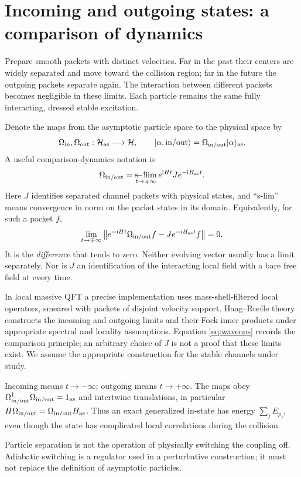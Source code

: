 \documentclass[11pt]{article}
\newcommand{\ii}{\mathrm i}
\newcommand{\ket}[1]{\lvert#1\rangle}
\newcommand{\module}[1]{\clearpage\section{#1}}
\newcommand{\cH}{\mathcal H}
\begin{document}
\module{Incoming and outgoing states: a comparison of dynamics}
Prepare smooth packets with distinct velocities. Far in the past their
centers are widely separated and move toward the collision region; far
in the future the outgoing packets separate again. The interaction
between different packets becomes negligible in these limits. Each
particle remains the same fully interacting, dressed stable excitation.

Denote the maps from the asymptotic particle space to the physical space by
\begin{equation}
 \Omega_{\rm in},\Omega_{\rm out}:\cH_{\rm as}\longrightarrow\cH,
 \qquad
 \ket{\alpha,\mathrm{in/out}}=\Omega_{\rm in/out}\ket{\alpha}_{\rm as}.
\end{equation}
A useful comparison-dynamics notation is
\begin{equation}
 \Omega_{\rm in/out}=\mathop{\mathrm{s\!-!lim}}_{t\to\mp\infty}
 e^{\ii Ht}J e^{-\ii H_{\rm as}t}.
 \label{eq:waveops}
\end{equation}
Here \(J\) identifies separated channel packets with physical states, and
``s-lim'' means convergence in norm on the packet states in its domain.
Equivalently, for such a packet \(f\),
\begin{equation}
 \lim_{t\to\mp\infty}
 \big\|e^{-\ii Ht}\Omega_{\rm in/out}f
       -J e^{-\ii H_{\rm as}t}f\big\|=0.
 \label{eq:comparison}
\end{equation}
It is the \emph{difference} that tends to zero. Neither evolving vector
usually has a limit separately. Nor is \(J\) an identification of the
interacting local field with a bare free field at every time.

In local massive QFT a precise implementation uses mass-shell-filtered
local operators, smeared with packets of disjoint velocity support.
Haag--Ruelle theory constructs the incoming and outgoing limits and their
Fock inner products under appropriate spectral and locality assumptions.
Equation \eqref{eq:waveops} records the comparison principle; an arbitrary
choice of \(J\) is not a proof that these limits exist. We assume the
appropriate construction for the stable channels under study.

\begin{keyidea}
Incoming means \(t\to-\infty\); outgoing means \(t\to+\infty\).
The maps obey \(\Omega_{\rm in/out}^\dagger\Omega_{\rm in/out}=1_{\rm as}\)
and intertwine translations, in particular
\(H\Omega_{\rm in/out}=\Omega_{\rm in/out}H_{\rm as}\).
Thus an exact generalized in-state has energy \(\sum_j E_{p_j}\), even
though the state has complicated local correlations during the collision.
\end{keyidea}
Particle separation is not the operation of physically switching the
coupling off. Adiabatic switching is a regulator used in a perturbative
construction; it must not replace the definition of asymptotic particles.
\end{document}
